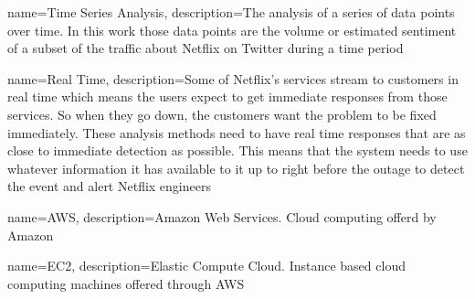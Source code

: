 \documentclass[12pt]{ucthesis}
\begin{document}
      {name={Time Series Analysis},
       description={The analysis of a series of data points over time. In this work those data
                    points are the volume or estimated sentiment of a subset of the traffic about
                    Netflix on Twitter during a time period}}

      {name={Real Time},
       description={Some of Netflix's services stream to customers in real time which means the
                    users expect to get immediate responses from those services. So when
                    they go down, the customers want the problem to be fixed immediately. These
                    analysis methods need to have real time responses that are as close to
                    immediate detection as possible. This means that the system needs to use
                    whatever information it has available to it up to right before the outage to
                    detect the event and alert Netflix engineers}}

      {name={AWS},
       description={Amazon Web Services. Cloud computing offerd by Amazon}}

      {name={EC2},
       description={Elastic Compute Cloud. Instance based cloud computing machines offered through AWS}}

\glsaddall
{}
\printglossaries

\clearpage


\end{document}
